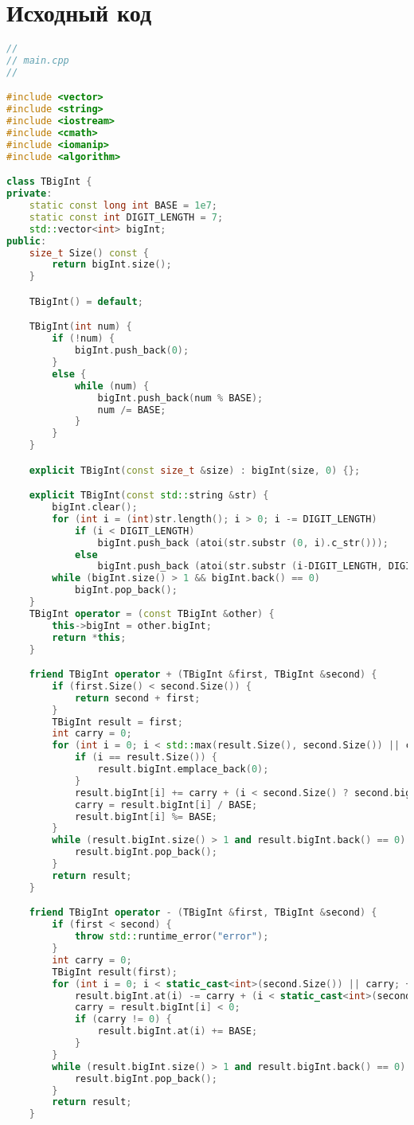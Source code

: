 \section{Исходный код}
\begin{lstlisting}[language=C++]
//
// main.cpp
//

#include <vector>
#include <string>
#include <iostream>
#include <cmath>
#include <iomanip>
#include <algorithm>

class TBigInt {
private:
    static const long int BASE = 1e7;
    static const int DIGIT_LENGTH = 7;
    std::vector<int> bigInt;
public:
    size_t Size() const {
        return bigInt.size();
    }

    TBigInt() = default;

    TBigInt(int num) {
        if (!num) {
            bigInt.push_back(0);
        }
        else {
            while (num) {
                bigInt.push_back(num % BASE);
                num /= BASE;
            }
        }
    }

    explicit TBigInt(const size_t &size) : bigInt(size, 0) {};

    explicit TBigInt(const std::string &str) {
        bigInt.clear();
        for (int i = (int)str.length(); i > 0; i -= DIGIT_LENGTH)
            if (i < DIGIT_LENGTH)
                bigInt.push_back (atoi(str.substr (0, i).c_str()));
            else
                bigInt.push_back (atoi(str.substr (i-DIGIT_LENGTH, DIGIT_LENGTH).c_str()));
        while (bigInt.size() > 1 && bigInt.back() == 0)
            bigInt.pop_back();
    }
    TBigInt operator = (const TBigInt &other) {
        this->bigInt = other.bigInt;
        return *this;
    }

    friend TBigInt operator + (TBigInt &first, TBigInt &second) {
        if (first.Size() < second.Size()) {
            return second + first;
        }
        TBigInt result = first;
        int carry = 0;
        for (int i = 0; i < std::max(result.Size(), second.Size()) || carry; ++i) {
            if (i == result.Size()) {
                result.bigInt.emplace_back(0);
            }
            result.bigInt[i] += carry + (i < second.Size() ? second.bigInt[i] : 0);
            carry = result.bigInt[i] / BASE;
            result.bigInt[i] %= BASE;
        }
        while (result.bigInt.size() > 1 and result.bigInt.back() == 0) {
            result.bigInt.pop_back();
        }
        return result;
    }

    friend TBigInt operator - (TBigInt &first, TBigInt &second) {
        if (first < second) {
            throw std::runtime_error("error");
        }
        int carry = 0;
        TBigInt result(first);
        for (int i = 0; i < static_cast<int>(second.Size()) || carry; ++i) {
            result.bigInt.at(i) -= carry + (i < static_cast<int>(second.Size()) ? second.bigInt[i] : 0);
            carry = result.bigInt[i] < 0;
            if (carry != 0) {
                result.bigInt.at(i) += BASE;
            }
        }
        while (result.bigInt.size() > 1 and result.bigInt.back() == 0) {
            result.bigInt.pop_back();
        }
        return result;
    }




\end{lstlisting}
